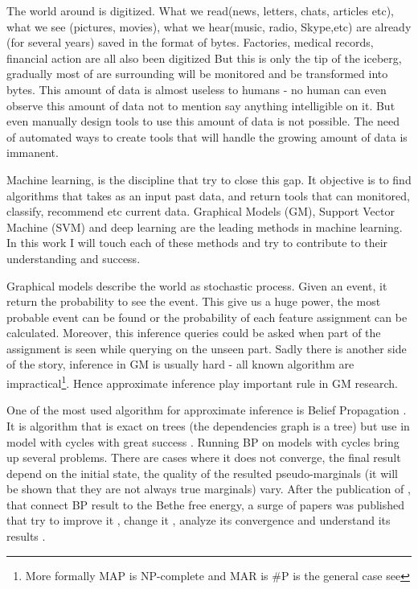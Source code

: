 The world around is digitized.
What we read(news, letters, chats, articles etc), what we see (pictures, movies), what we hear(music, radio, Skype,etc) are already (for several years) saved in the format of bytes.
Factories, medical records, financial action are all also been digitized
But this is only the tip of the iceberg, gradually most of are surrounding will be monitored and be transformed into  bytes.
This amount of data is almost useless to humans - no human can even observe this amount of data not to mention say anything intelligible on it.
But even manually design tools to use this amount of data is not possible.
The need of automated ways to create tools that will handle the growing amount of data is immanent.   

Machine learning, is the discipline that try to close this gap.
It objective is to find algorithms that takes as an input past data, and return tools that can monitored, classify, recommend etc current data.
Graphical Models (GM), Support Vector Machine (SVM) and deep learning are the leading methods in machine learning.
In this work I will touch each of these methods and try to contribute to their understanding and success.

Graphical models describe the world as stochastic process.
Given an event, it return the probability to see the event.
This give us a huge power, the most probable event can be found or the probability of each feature assignment can be calculated.
Moreover, this inference queries could be asked when part of the assignment is seen while querying on the unseen part.
Sadly there is another side of the story, inference in GM is usually hard - all known algorithm are impractical\footnote{More formally MAP is NP-complete and MAR is \#P is the general case see }.
Hence approximate inference play important rule in GM research.

One of the most used algorithm for approximate inference is Belief Propagation \cite{pearl1986fusion}.
It is algorithm that is exact on trees (the dependencies graph is a tree) but use in model with cycles with great success \cite{willsky2002multiresolution,loeliger2004introduction,kschischang2003codes}.
Running BP on models with cycles bring up several problems.
There are cases where it does not converge, the final result depend on the initial state, the quality of the resulted pseudo-marginals (it will be shown that they are not always true marginals) vary.
After the publication of \cite{yedidia2000generalized}, that connect BP result to the Bethe free energy, a surge of papers was published that try to improve it \cite{elidan2012residual}, change it \cite{welling2001belief,wainwright2003tree,meshi2009convexifying}, analyze its convergence \cite{tatikonda2002loopy,mooij2007sufficient,roosta2008convergence} and understand its results \cite{heskes2002stable,yedidia2005constructing,AlanNips2007,YusukeNips2009,RuozziNips2012}.

